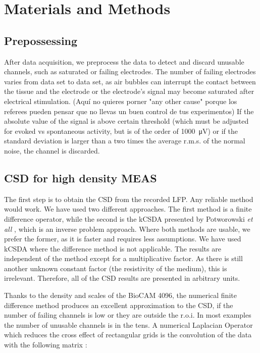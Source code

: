 \documentclass[utf8]{frontiersSCNS}
\newcommand{\muV}[1]{\SI{#1}{\micro\volt}}
\begin{document}
\section{Materials and Methods}

\subsection{Prepossessing}

After data acquisition, we preprocess the data to detect and discard unusable channels,
such as saturated or failing electrodes. The
number of failing electrodes varies from data set to data set,
as air bubbles can interrupt the contact between the tissue and the electrode or the electrode's signal may become saturated 
after electrical stimulation. (Aquí no quieres porner "any other cause" porque los referees pueden pensar que no llevas un buen control de tus experimentos) 
If the absolute value of the signal is above certain threshold (which must be
adjusted for evoked vs spontaneous activity, but
is of the order of \muV{1000}) or if the standard deviation is
larger than a two times the average r.m.s.  of the normal noise,
the channel is discarded.


\subsection{CSD for high density MEAS}

The first step is to obtain the CSD from the recorded LFP.
Any reliable method would work.
We have used two different
approaches. The first method is a  finite difference operator,
while the second is the kCSDA presented by
Potworowski \emph{et all} \citep{Potworowski2011},
which is an inverse problem approach.
Where both methods are usable, we prefer the former,
as it is faster and requires less assumptions.
We have used kCSDA where
the difference method is not applicable. The results are
independent of the method except for a multiplicative factor.
As there is still another unknown constant factor
(the resistivity of the medium), this is irrelevant.
Therefore, all of the CSD results are presented in arbitrary units.

Thanks to the density and scales of the BioCAM 4096,
the numerical finite difference method
produces an excellent approximation to the CSD,
if the number of failing channels is low or
they are outside the r.o.i.
In most examples the number of unusable channels is in the tens.
A  numerical Laplacian Operator which reduces the cross effect of
rectangular grids is the convolution of the data with the following
matrix \citep{Lindberg90}:
\end{document}
